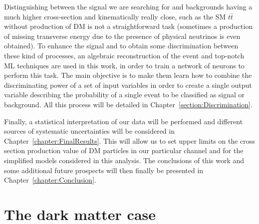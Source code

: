\documentclass[a4paper, 10pt, openright]{report}
\begin{document}
Distinguishing between the signal we are searching for and backgrounds having a much higher cross-section and kinematically really close, such as the \ac{SM} $t \bar t$ without production of \ac{DM} is not a straightforward task (sometimes a production of missing transverse energy due to the presence of physical neutrinos is even obtained). To enhance the signal and to obtain some discrimination between these kind of processes, an algebraic reconstruction of the event and top-notch \ac{ML} techniques are used in this work, in order to train a network of neurons to perform this task. The main objective is to make them learn how to combine the discriminating power of a set of input variables in order to create a single output variable describing the probability of a single event to be classified as signal or background. All this process will be detailed in Chapter~\ref{section:Discrimination}.

Finally, a statistical interpretation of our data will be performed and different sources of systematic uncertainties will be considered in Chapter~\ref{chapter:FinalResults}. This will allow us to set upper limits on the cross section production value of \ac{DM} particles in our particular channel and for the simplified models considered in this analysis. The conclusions of this work and some additional future prospects will then finally be presented in Chapter~\ref{chapter:Conclusion}.


\clearpage
\thispagestyle{empty}
\phantom{a}
\vfill
\newpage




































\chapter{The dark matter case}\label{chapter:Case}
\end{document}
